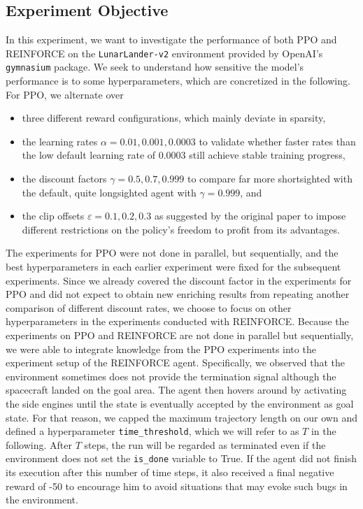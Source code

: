 \documentclass[a4paper, 11pt]{article}
\begin{document}
	\subsection{Experiment Objective}
	In this experiment, we want to investigate the performance of both PPO and REINFORCE on the \texttt{LunarLander-v2} environment provided by OpenAI's \texttt{gymnasium} package. We seek to understand how sensitive the model's performance is to some hyperparameters, which are concretized in the following.
	For PPO, we alternate over
	\begin{itemize}
		\item three different reward configurations, which mainly deviate in sparsity,
		\item the learning rates $\alpha=0.01,0.001,0.0003$ to validate whether faster rates than the low default learning rate of $0.0003$ still achieve stable training progress,
		\item the discount factors $\gamma=0.5,0.7,0.999$ to compare far more shortsighted with the default, quite longsighted agent with $\gamma=0.999$, and
		\item the clip offsets $\varepsilon=0.1,0.2,0.3$ as suggested by the original paper \cite{schulman2017proximal} to impose different restrictions on the policy's freedom to profit from its advantages.
	\end{itemize}
	The experiments for PPO were not done in parallel, but sequentially, and the best hyperparameters in each earlier experiment were fixed for the subsequent experiments.
	Since we already covered the discount factor in the experiments for PPO and did not expect to obtain new enriching results from repeating another comparison of different discount rates, we choose to focus on other hyperparameters in the experiments conducted with REINFORCE.
	Because the experiments on PPO and REINFORCE are not done in parallel but sequentially, we were able to integrate knowledge from the PPO experiments into the experiment setup of the REINFORCE agent.
	Specifically, we observed that the environment sometimes does not provide the termination signal although the spacecraft landed on the goal area. The agent then hovers around by activating the side engines until the state is eventually accepted by the environment as goal state.
	For that reason, we capped the maximum trajectory length on our own and defined a hyperparameter \texttt{time\_threshold}, which we will refer to as $T$ in the following. After $T$ steps, the run will be regarded as terminated even if the environment does not set the \texttt{is\_done} variable to True. If the agent did not finish its execution after this number of time steps, it also received a final negative reward of -50 to encourage him to avoid situations that may evoke such bugs in the environment.
\end{document}
